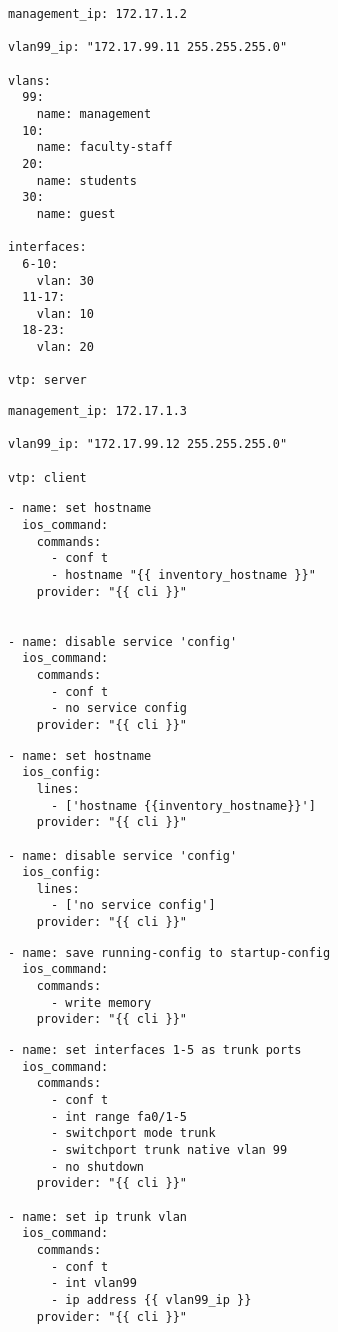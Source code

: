 \begin{Verbatim}[frame=topline, framesep=4mm, label=\fbox{host\_vars/switch1.yaml}]
management_ip: 172.17.1.2

vlan99_ip: "172.17.99.11 255.255.255.0"

vlans:
  99:
    name: management
  10:
    name: faculty-staff
  20:
    name: students
  30:
    name: guest

interfaces:
  6-10:
    vlan: 30
  11-17:
    vlan: 10
  18-23:
    vlan: 20

vtp: server
\end{Verbatim}
\begin{Verbatim}[frame=topline, framesep=4mm, label=\fbox{host\_vars/switch2.yaml}]
management_ip: 172.17.1.3

vlan99_ip: "172.17.99.12 255.255.255.0"

vtp: client
\end{Verbatim}
\begin{Verbatim}[frame=topline, framesep=4mm, label=\fbox{roles/common-command/tasks/main.yaml}]
- name: set hostname
  ios_command:
    commands:
      - conf t
      - hostname "{{ inventory_hostname }}"
    provider: "{{ cli }}"


- name: disable service 'config'
  ios_command:
    commands:
      - conf t
      - no service config
    provider: "{{ cli }}"
\end{Verbatim}
\begin{Verbatim}[frame=topline, framesep=4mm, label=\fbox{roles/common-config/tasks/main.yaml}]
- name: set hostname
  ios_config:
    lines:
      - ['hostname {{inventory_hostname}}']
    provider: "{{ cli }}"

- name: disable service 'config'
  ios_config:
    lines:
      - ['no service config']
    provider: "{{ cli }}"
\end{Verbatim}
\begin{Verbatim}[frame=topline, framesep=4mm, label=\fbox{roles/saveconfig/tasks/main.yaml}]    
- name: save running-config to startup-config
  ios_command:
    commands:
      - write memory
    provider: "{{ cli }}"
\end{Verbatim}
\begin{Verbatim}[frame=topline, framesep=4mm, label=\fbox{roles/trunking/tasks/main.yaml}]       
- name: set interfaces 1-5 as trunk ports
  ios_command:
    commands:
      - conf t
      - int range fa0/1-5
      - switchport mode trunk
      - switchport trunk native vlan 99
      - no shutdown
    provider: "{{ cli }}"

- name: set ip trunk vlan
  ios_command:
    commands:
      - conf t
      - int vlan99
      - ip address {{ vlan99_ip }}
    provider: "{{ cli }}"
\end{Verbatim}
